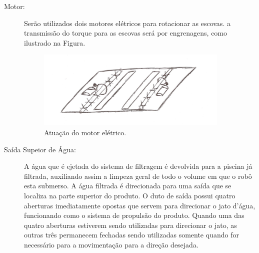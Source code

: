 \begin{description}
\item[Motor:] Serão utilizados dois motores elétricos para rotacionar as escovas.
a transmissão do torque para as escovas será por engrenagens, como ilustrado na
Figura.
\par
\begin{figure}[h]
  \centering
  \includegraphics[width=0.9\textwidth]{figures/eletric-motor.png}
  \caption{Atuação do motor elétrico.}
  \label{fig:eletric-motor}
\end{figure}
\FloatBarrier

\item[Saída Supeior de Água:] A água que é ejetada do sistema de filtragem é
devolvida para a piscina já filtrada, auxiliando assim a limpeza geral de todo
o volume em que o robô esta submerso. A água filtrada é direcionada para uma
saída que se localiza na parte superior do produto. O duto de saída possui quatro
aberturas imediatamente opostas que servem para direcionar o jato d’água,
funcionando como o sistema de propulsão do produto. Quando uma das quatro aberturas
estiverem sendo utilizadas para direcionar o jato, as outras três permanecem
fechadas sendo utilizadas somente quando for necessário para a movimentação para a
direção desejada.


\end{description}
